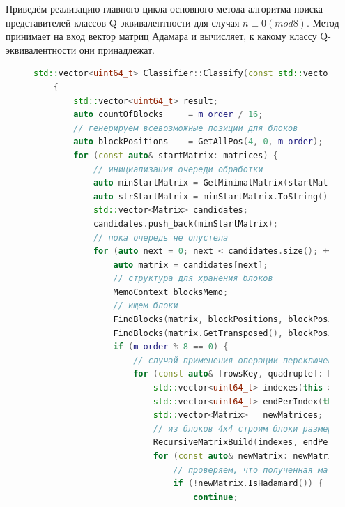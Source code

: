 Приведём реализацию главного цикла основного метода алгоритма поиска представителей классов Q-эквивалентности для случая $n \equiv 0(mod8)$. Метод принимает на вход вектор матриц Адамара и вычисляет, к какому классу Q-эквивалентности они принадлежат.

\begin{figure}[H]
    \centering
    \begin{minipage}{\linewidth}
    \begin{lstlisting}[language=c++, tabsize=2, showspaces=false, basicstyle=\fontsize{8}{9}\selectfont, numbers=none]
    std::vector<uint64_t> Classifier::Classify(const std::vector<Matrix>& matrices) const
    {
        std::vector<uint64_t> result;
        auto countOfBlocks     = m_order / 16;
        // генерируем всевозможные позиции для блоков
        auto blockPositions    = GetAllPos(4, 0, m_order);
        for (const auto& startMatrix: matrices) {
            // инициализация очереди обработки
            auto minStartMatrix = GetMinimalMatrix(startMatrix);
            auto strStartMatrix = minStartMatrix.ToString();
            std::vector<Matrix> candidates;
            candidates.push_back(minStartMatrix);
            // пока очередь не опустела
            for (auto next = 0; next < candidates.size(); ++next) {
                auto matrix = candidates[next];
                // структура для хранения блоков
                MemoContext blocksMemo;
                // ищем блоки
                FindBlocks(matrix, blockPositions, blockPositions, blocksMemo.rowBlocksMemo);
                FindBlocks(matrix.GetTransposed(), blockPositions, blockPositions, blocksMemo.colBlocksMemo);
                if (m_order % 8 == 0) {
                    // случай применения операции переключения для строк
                    for (const auto& [rowsKey, quadruple]: blocksMemo.rowBlocksMemo) {
                        std::vector<uint64_t> indexes(this->m_order / 16, 0);
                        std::vector<uint64_t> endPerIndex(this->m_order / 16, quadruple.size());
                        std::vector<Matrix>   newMatrices;
                        // из блоков 4x4 строим блоки размера 4x(n/4) и применяем операцию переключения
                        RecursiveMatrixBuild(indexes, endPerIndex, 0, 0, matrix, quadruple, newMatrices, false);
                        for (const auto& newMatrix: newMatrices) {
                            // проверяем, что полученная матрица соотв-ет определению матрицы Адамара
                            if (!newMatrix.IsHadamard()) {
                                continue;

\end{lstlisting}
\end{minipage}
\end{figure}
